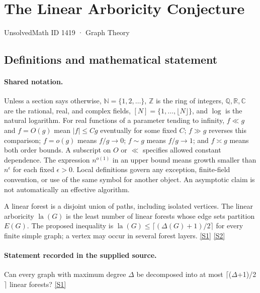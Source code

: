 \documentclass[11pt,a4paper]{article}
\newcommand{\N}{\mathbb{N}}
\newcommand{\Z}{\mathbb{Z}}
\newcommand{\Q}{\mathbb{Q}}
\newcommand{\R}{\mathbb{R}}
\newcommand{\C}{\mathbb{C}}
\newcommand{\sref}[2]{\hyperlink{source:#1:#2}{[S#2]}}
\begin{document}

\setcounter{section}{1418}

\section{The Linear Arboricity Conjecture}\label{1419}

{\small\sffamily UnsolvedMath ID 1419 · Graph Theory}

\subsection{Definitions and mathematical statement}

\paragraph{Shared notation.}Unless a section says otherwise, $\N=\{1,2,\ldots\}$,
$\Z$ is the ring of integers, $\Q,\R,\C$ are the rational, real, and complex
fields, $[N]=\{1,\ldots,\lfloor N\rfloor\}$, and $\log$ is the natural
logarithm. For real functions of a parameter tending to infinity,
$f\ll g$ and $f=O(g)$ mean $|f|\leq Cg$ eventually for some fixed $C$;
$f\gg g$ reverses this comparison; $f=o(g)$ means $f/g\to0$;
$f\sim g$ means $f/g\to1$; and $f\asymp g$ means both order bounds.
A subscript on $O$ or $\ll$ specifies allowed constant dependence.
The expression $n^{o(1)}$ in an upper bound means growth smaller than
$n^\epsilon$ for each fixed $\epsilon>0$. Local definitions govern any
exception, finite-field convention, or use of the same symbol for another
object. An asymptotic claim is not automatically an effective algorithm.



A linear forest is a disjoint union of paths, including isolated vertices. The linear arboricity $\operatorname{la}(G)$ is the least number of linear forests whose edge sets partition $E(G)$. The proposed inequality is $\operatorname{la}(G)\leq\lceil(\Delta(G)+1)/2\rceil$ for every finite simple graph; a vertex may occur in several forest layers. \sref{1419}{1} \sref{1419}{2}

\paragraph{Statement recorded in the supplied source.}
Can every graph with maximum degree \ensuremath{Δ} be decomposed into at most \ensuremath{⌈}(\ensuremath{Δ}+1)/2\ensuremath{⌉} linear forests? \sref{1419}{1}
\end{document}
